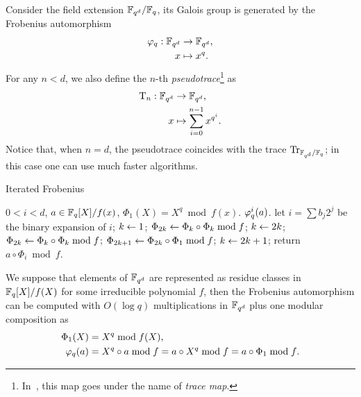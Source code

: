 Consider the field extension $\mathbb{F}_{q^d}/\mathbb{F}_q$, its Galois group is
generated by the Frobenius automorphism
\begin{equation}
  \label{eq:199}
  \begin{aligned}
  \varphi_q : \mathbb{F}_{q^d}&\rightarrow\mathbb{F}_{q^d}\text{,}\\
  x &\mapsto x^{q}\text{.}
  \end{aligned}
\end{equation}
For any $n<d$, we also define the $n$-th
\emph{pseudotrace}\footnote{In~\cite{vzgathen+shoup92},
  this map goes under the name of \emph{trace map}.}
as
\begin{equation}
  \label{eq:202}
  \begin{aligned}
    \operatorname{T}_n : \mathbb{F}_{q^d}&\rightarrow\mathbb{F}_{q^d}\text{,}\\
    x&\mapsto\sum_{i=0}^{n-1} x^{q^i}\text{.}
  \end{aligned}
\end{equation}
Notice that, when $n=d$, the pseudotrace coincides with the trace
$\operatorname{Tr}_{\mathbb{F}_{q^d}/\mathbb{F}_q}$; in this case one can use much faster
algorithms.


\begin{algorithm}
  \caption{Iterated Frobenius}
  \label{alg:itfrob}
  \begin{algorithmic}[1]
    \REQUIRE $0<i<d$, $a\in\mathbb{F}_q[X]/f(x)$, $\Phi_1(X) = X^q\bmod f(x)$.
    \ENSURE $\varphi_q^i(a)$.
    \STATE let $i=\sum b_j2^j$ be the binary expansion of $i$;
    \STATE $k \leftarrow 1$;
    \STATE $\Phi_{2k} \leftarrow \Phi_k\circ\Phi_k \bmod f$;
    \STATE $k \leftarrow 2k$;
    \ELSE
    \STATE $\Phi_{2k} \leftarrow \Phi_k\circ\Phi_k \bmod f$;
    \STATE $\Phi_{2k+1} \leftarrow \Phi_{2k}\circ\Phi_1 \bmod f$;
    \STATE $k \leftarrow 2k +1$;
    \ENDIF
    \ENDFOR
    \STATE return $a\circ\Phi_i \bmod f$.
  \end{algorithmic}
\end{algorithm}

We suppose that elements of $\mathbb{F}_{q^d}$ are represented as residue
classes in $\mathbb{F}_q[X]/f(X)$ for some irreducible polynomial $f$, then
the Frobenius automorphism can be computed with $O(\log q)$
multiplications in $\mathbb{F}_{q^d}$ plus one modular composition as
\begin{align}
  \label{eq:203}
  \Phi_1(X) &= X^q \bmod f(X)\text{,}\\
  \varphi_q(a) &= X^q\circ a\bmod f = a\circ X^q\bmod f = a\circ \Phi_1\bmod f
  \text{.}
\end{align}



